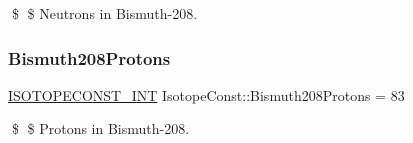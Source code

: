 \$ \$ Neutrons in Bismuth-\/208. \mbox{\label{group___isotope_const-_bismuth-_bi208_ga6ad34f2da74e0460bca20566deadcd7a}} 
\subsubsection{\texorpdfstring{Bismuth208\+Protons}{Bismuth208Protons}}
{\footnotesize\ttfamily \mbox{\hyperlink{group___isotope_const-_macros_ga5f18360b3e99483a35c32d789e62621c}{I\+S\+O\+T\+O\+P\+E\+C\+O\+N\+S\+T\+\_\+\+I\+NT}} Isotope\+Const\+::\+Bismuth208\+Protons = 83}

\$ \$ Protons in Bismuth-\/208. 
